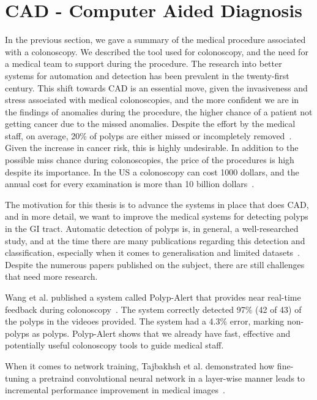 \section{CAD - Computer Aided Diagnosis}
\label{cha:CAD}
In the previous section, we gave a summary of the medical procedure associated with a colonoscopy. We described the tool used for colonoscopy,  and the need for a medical team to support during the procedure.
The research into better systems for automation and detection has been prevalent in the twenty-first century.  This shift towards CAD is an essential move, given the invasiveness and stress associated with medical colonoscopies, and the more confident we are in the findings of anomalies during the procedure, the higher chance of a patient not getting cancer due to the missed anomalies.
Despite the effort by the medical staff, on average, 20\% of polyps are either missed or incompletely removed~\cite{kaminski2010quality}. Given the increase in cancer risk, this is highly undesirable.
In addition to the possible miss chance during colonoscopies, the price of the procedures is high despite its importance. In the US a colonoscopy can cost 1000 dollars, and the annual cost for every examination is more than 10 billion dollars~\cite{NYT_cancer, NYT_cancer2}.

The motivation for this thesis is to advance the systems in place that does CAD, and in more detail, we want to improve the medical systems for detecting polyps in the GI tract. 
Automatic detection of polyps is, in general, a well-researched study, and at the time there are many publications regarding this detection and classification, especially when it comes to generalisation and limited datasets~\cite{riegler2016multimedia}.  
Despite the numerous papers published on the subject, there are still challenges that need more research. 

Wang et al. published a system called Polyp-Alert that provides near real-time feedback during colonoscopy~\cite{wang2015polyp}. The system correctly detected 97\% (42 of 43) of the polyps in the videoes provided. The system had a 4.3\% error, marking non-polyps as polyps. Polyp-Alert shows that we already have fast, effective and potentially useful colonoscopy tools to guide medical staff.

When it comes to network training,  Tajbakhsh et al. demonstrated how fine-tuning a pretraind convolutional neural network in a layer-wise manner leads to incremental performance improvement in medical images~\cite{DBLP:journals/corr/TajbakhshSGHKGL17}.

